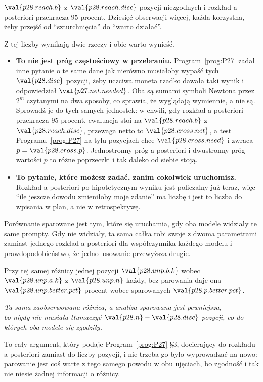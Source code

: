 \begin{fr}

$\val{p28.reach.b}$ z $\val{p28.reach.disc}$ pozycji niezgodnych i rozkład
a posteriori przekracza $95$ procent. Dziesięć obserwacji więcej, każda
korzystna, żeby przejść od \enquote{szturchnięcia} do \enquote{warto
działać}.

Z tej liczby wynikają dwie rzeczy i obie warto wynieść.

\begin{itemize}
\item \textbf{To nie jest próg częstościowy w przebraniu.}
  Program~\ref{prog:P27} zadał inne pytanie o te same dane
  \dash{} jak nierówno musiałoby wypaść tych $\val{p28.disc}$ pozycji, żeby
  uczciwa moneta rzadko dawała taki wynik \dash{} i odpowiedział
  $\val{p27.net.needed}$. Oba są sumami symboli Newtona przez
  $2^{m}$ czytanymi na dwa sposoby, co sprawia, że wyglądają wymiennie, a nie
  są. Sprowadź je do tych samych jednostek: w chwili, gdy rozkład a
  posteriori przekracza $95$ procent, ewaluacja stoi na $\val{p28.reach.b}$
  z $\val{p28.reach.disc}$, przewaga netto to $\val{p28.cross.net}$, a test
  Programu~\ref{prog:P27} na tylu pozycjach chce $\val{p28.cross.need}$ i
  zwraca $p = \val{p28.cross.p}$. Jednostronny próg a posteriori i
  dwustronny próg wartości $p$ to różne poprzeczki i tak daleko od siebie
  stoją.
\item \textbf{To pytanie, które możesz zadać, zanim cokolwiek uruchomisz.}
  Rozkład a posteriori po hipotetycznym wyniku jest policzalny już teraz, więc
  \enquote{ile jeszcze dowodu zmieniłoby moje zdanie} ma liczbę i jest to
  liczba do wpisania w plan, a nie w retrospektywę.
\end{itemize}
\end{fr}

\begin{fr}
Porównanie sparowane jest tym, które się uruchamia, gdy oba modele widziały
te same prompty. Gdy nie widziały, ta sama całka robi swoje z dwoma
parametrami zamiast jednego \dash{} rozkład a posteriori dla współczynnika
każdego modelu i prawdopodobieństwo, że jedno losowanie przewyższa drugie.

Przy tej samej różnicy jednej pozycji \dash{} $\val{p28.unp.b.k}$ wobec
$\val{p28.unp.a.k}$ z $\val{p28.unp.n}$ każdy, bez parowania \dash{} daje ona
$\val{p28.unp.better.pct}$ procent wobec sparowanych
$\val{p28.p.better.pct}$.

\begin{center}
\emph{Ta sama zaobserwowana różnica, a analiza sparowana jest pewniejsza,\\
bo nigdy nie musiała tłumaczyć $\val{p28.n} - \val{p28.disc}$ pozycji,
co do których oba modele się zgodziły.}
\end{center}

To cały argument, który podaje Program~\ref{prog:P27} §3, docierający do
rozkładu a posteriori zamiast do liczby pozycji, i nie trzeba go było
wyprowadzać na nowo: parowanie jest coś warte z tego samego powodu w obu
ujęciach, bo zgodność i tak nie niesie żadnej informacji o różnicy.
\end{fr}

